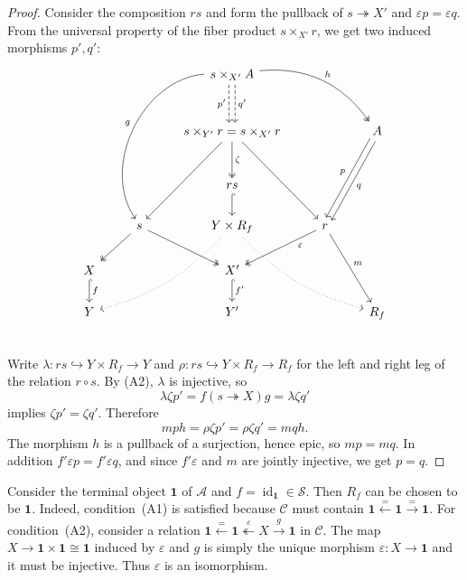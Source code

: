 \documentclass[11pt]{amsart}
\theoremstyle{definition}
\theoremstyle{remark}
\newcommand\cA{\mathcal A}
\newcommand\cC{\mathcal C}
\newcommand\cS{\mathcal S}
\newcommand\id{\operatorname{id}}
\renewcommand\:\colon
\newcommand\one{\mathbf{1}}
\renewcommand\:\colon
\newcommand\eps{\varepsilon}
\newcommand\tto{\twoheadrightarrow}
\begin{document}
\begin{proof}
    Consider the composition $rs$ and form the pullback of $s \tto X'$ and $\eps p = \eps q$. From the universal property of the fiber product $s\times_{X'} r$, we get two induced morphisms  $p', q'$:
    \[\begin{tikzcd}
        && s \times_{X'} A \arrow[bend right=60,swap]{lddd}{g} \arrow[two heads,bend left]{rrd}{h} \arrow[dashed,shift right,swap]{d}{p'} \arrow[dashed,shift left]{d}{q'} && \\[0.4cm]
        && s \times_{Y'} r = s \times_{X'} r \arrow{ldd} \arrow{rdd} \arrow[two heads]{d}{\zeta} && A \arrow[shift right,swap]{ldd}{p} \arrow[shift left]{ldd}{q} \\[0.4cm]
        && rs \arrow[hook]{d} && \\
        & s \arrow[two heads]{ld} \arrow[two heads]{rd} & Y \times R_f \arrow[dotted,bend left=15]{lldd}\arrow[dotted,bend right=15]{rrdd} & r \arrow[two heads,pos=.3]{ld}{\eps} \arrow{rdd}{m} & \\
        X \arrow[hook]{d}{f} && X' \arrow[hook]{d}{f'} && \\
        Y && Y' && R_f \\
    \end{tikzcd}\vspace{-.5cm}\]
    Write $\lambda: rs \hookrightarrow Y \times R_f \to Y$ and $\rho: rs \hookrightarrow Y \times R_f \to R_f$ for the left and right leg of the relation $r \circ s$. By (A2), $\lambda$ is injective, so 
    \[
        \lambda \zeta p' = f(s \tto X)g = \lambda \zeta q'
    \]
    implies $\zeta p' = \zeta q'$. Therefore
    \[
        mph = \rho\zeta p' = \rho\zeta q' = mqh.
    \]
    The morphism $h$ is a pullback of a surjection, hence epic, so $mp = mq$. In addition $f'\eps p = f'\eps q$, and since $f'\eps$ and $m$ are jointly injective, we get $p = q$.
\end{proof}

\begin{example} \label{e:terminal-occurs-as-rank}
    Consider the terminal object $\one$ of $\cA$ and $f = \id_\one \in \cS$. Then $R_f$ can be chosen to be $\one$. Indeed, condition~(A1) is satisfied because $\cC$ must contain $\one \xleftarrow{=} \one \xrightarrow{=} \one$. For condition~(A2), consider a relation $\one \xleftarrow{=} \one \stackrel{\eps}{\twoheadleftarrow} X \xrightarrow{g} \one$ in $\cC$. The map $X \to \one \times \one \cong \one$ induced by $\eps$ and $g$ is simply the unique morphism $\eps: X \to \one$ and it must be injective. Thus $\eps$ is an isomorphism.
\end{example}
\end{document}

